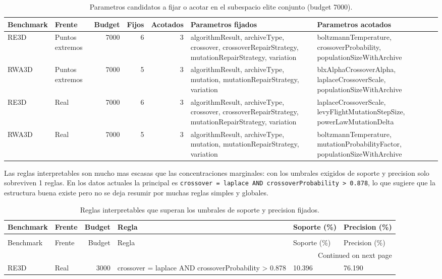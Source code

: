 \documentclass[11pt,a4paper]{article}
\begin{document}
{\scriptsize
\begin{table}[p]
\centering
\caption{Parametros candidatos a fijar o acotar en el subespacio elite conjunto (budget 7000).}
\label{tab:elite_actions}
\begin{tabular}{llrrrll}
\toprule
Benchmark & Frente & Budget & Fijos & Acotados & Parametros fijados & Parametros acotados \\
\midrule
RE3D & Puntos extremos & 7000 & 6 & 3 & algorithmResult, archiveType, crossover, crossoverRepairStrategy, mutationRepairStrategy, variation & boltzmannTemperature, crossoverProbability, populationSizeWithArchive \\
RWA3D & Puntos extremos & 7000 & 5 & 3 & algorithmResult, archiveType, mutation, mutationRepairStrategy, variation & blxAlphaCrossoverAlpha, laplaceCrossoverScale, populationSizeWithArchive \\
RE3D & Real & 7000 & 6 & 3 & algorithmResult, archiveType, crossover, crossoverRepairStrategy, mutationRepairStrategy, variation & laplaceCrossoverScale, levyFlightMutationStepSize, powerLawMutationDelta \\
RWA3D & Real & 7000 & 5 & 3 & algorithmResult, archiveType, mutation, mutationRepairStrategy, variation & boltzmannTemperature, mutationProbabilityFactor, populationSizeWithArchive \\
\bottomrule
\end{tabular}
\end{table}

}

Las reglas interpretables son mucho mas escasas que las concentraciones marginales: con los umbrales exigidos de soporte y precision solo sobreviven 1 reglas. En los datos actuales la principal es \texttt{crossover = laplace AND crossoverProbability > 0.878}, lo que sugiere que la estructura buena existe pero no se deja resumir por muchas reglas simples y globales.

{\scriptsize
\setlength{\LTpre}{0pt}
\setlength{\LTpost}{0pt}
\begin{longtable}{llrlll}
\caption{Reglas interpretables que superan los umbrales de soporte y precision fijados.} \label{tab:conditional_rules} \\
\toprule
Benchmark & Frente & Budget & Regla & Soporte (\%) & Precision (\%) \\
\midrule
\endfirsthead
\caption[]{Reglas interpretables que superan los umbrales de soporte y precision fijados.} \\
\toprule
Benchmark & Frente & Budget & Regla & Soporte (\%) & Precision (\%) \\
\midrule
\endhead
\midrule
\multicolumn{6}{r}{Continued on next page} \\
\midrule
\endfoot
\bottomrule
\endlastfoot
RE3D & Real & 3000 & crossover = laplace AND crossoverProbability > 0.878 & 10.396 & 76.190 \\
\end{longtable}

}
\end{document}
